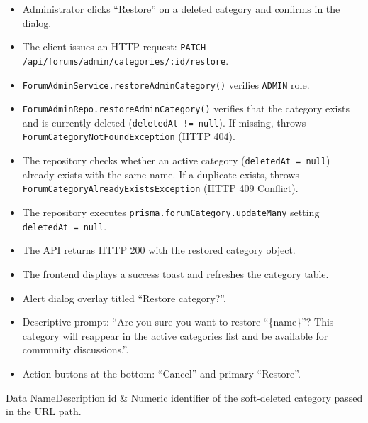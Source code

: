 \begin{itemize}[leftmargin=1.6em,topsep=3pt,itemsep=2pt,parsep=0pt,label=$\bullet$]
    \item Administrator clicks ``Restore'' on a deleted category and confirms in the dialog.
    \item The client issues an HTTP request: \texttt{PATCH /\allowbreak{}api/\allowbreak{}forums/\allowbreak{}admin/\allowbreak{}categories/\allowbreak{}:\allowbreak{}id/\allowbreak{}restore}.
    \item \texttt{ForumAdminService.restoreAdminCategory()} verifies \texttt{ADMIN} role.
    \item \texttt{ForumAdminRepo.restoreAdminCategory()} verifies that the category exists and is currently deleted (\texttt{deletedAt != null}). If missing, throws \texttt{ForumCategoryNotFoundException} (HTTP 404).
    \item The repository checks whether an active category (\texttt{deletedAt = null}) already exists with the same name. If a duplicate exists, throws \texttt{ForumCategoryAlreadyExistsException} (HTTP 409 Conflict).
    \item The repository executes \texttt{prisma.forumCategory.updateMany} setting \texttt{deletedAt = null}.
    \item The API returns HTTP 200 with the restored category object.
    \item The frontend displays a success toast and refreshes the category table.
\end{itemize}

\begin{itemize}[leftmargin=1.6em,topsep=3pt,itemsep=2pt,parsep=0pt,label=$\bullet$]
    \item Alert dialog overlay titled ``Restore category?''.
    \item Descriptive prompt: ``Are you sure you want to restore ``\{name\}''? This category will reappear in the active categories list and be available for community discussions.''.
    \item Action buttons at the bottom: ``Cancel'' and primary ``Restore''.
\end{itemize}


\begin{specdatatable}{Data Name}{Description}
id & Numeric identifier of the soft-deleted category passed in the URL path.\\ \hline
\end{specdatatable}

